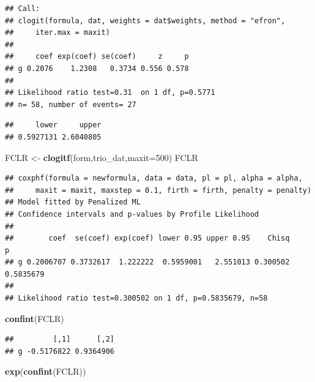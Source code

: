 \documentclass[
]{article}
\newenvironment{Shaded}{\begin{snugshade}}{\end{snugshade}}
\newcommand{\AttributeTok}[1]{\textcolor[rgb]{0.13,0.29,0.53}{#1}}
\newcommand{\DecValTok}[1]{\textcolor[rgb]{0.00,0.00,0.81}{#1}}
\newcommand{\FunctionTok}[1]{\textcolor[rgb]{0.13,0.29,0.53}{\textbf{#1}}}
\newcommand{\NormalTok}[1]{#1}
\newcommand{\OtherTok}[1]{\textcolor[rgb]{0.56,0.35,0.01}{#1}}
\newcommand{\SpecialCharTok}[1]{\textcolor[rgb]{0.81,0.36,0.00}{\textbf{#1}}}
\begin{document}
\begin{verbatim}
## Call:
## clogit(formula, dat, weights = dat$weights, method = "efron", 
##     iter.max = maxit)
## 
##     coef exp(coef) se(coef)     z     p
## g 0.2076    1.2308   0.3734 0.556 0.578
## 
## Likelihood ratio test=0.31  on 1 df, p=0.5771
## n= 58, number of events= 27
\end{verbatim}

\begin{Shaded}
\end{Shaded}

\begin{verbatim}
##     lower     upper 
## 0.5927131 2.6040805
\end{verbatim}

\begin{Shaded}
\begin{Highlighting}[]
\NormalTok{FCLR }\OtherTok{\textless{}{-}} \FunctionTok{clogitf}\NormalTok{(form,trio\_dat,}\AttributeTok{maxit=}\DecValTok{500}\NormalTok{)}
\NormalTok{FCLR}
\end{Highlighting}
\end{Shaded}

\begin{verbatim}
## coxphf(formula = newformula, data = data, pl = pl, alpha = alpha, 
##     maxit = maxit, maxstep = 0.1, firth = firth, penalty = penalty)
## Model fitted by Penalized ML
## Confidence intervals and p-values by Profile Likelihood 
## 
##        coef  se(coef) exp(coef) lower 0.95 upper 0.95    Chisq         p
## g 0.2006707 0.3732617  1.222222  0.5959001   2.551013 0.300502 0.5835679
## 
## Likelihood ratio test=0.300502 on 1 df, p=0.5835679, n=58
\end{verbatim}

\begin{Shaded}
\begin{Highlighting}[]
\FunctionTok{confint}\NormalTok{(FCLR)}
\end{Highlighting}
\end{Shaded}

\begin{verbatim}
##         [,1]      [,2]
## g -0.5176822 0.9364906
\end{verbatim}

\begin{Shaded}
\begin{Highlighting}[]
\FunctionTok{exp}\NormalTok{(}\FunctionTok{confint}\NormalTok{(FCLR))}
\end{Highlighting}
\end{Shaded}
\end{document}

